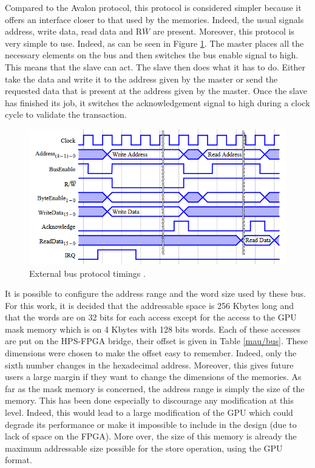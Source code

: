 Compared to the Avalon protocol, this protocol is considered simpler because it offers an interface 
closer to that used by the memories.
Indeed, the usual signals address, write data, read data and R$\overline{W}$ are 
present. Moreover, this protocol is very simple to use. Indeed, as can be seen in Figure \ref{fig:mau/bus_bridge_protocol}. The master 
places all the necessary elements on the bus and then switches the bus enable signal to high. This means 
that the slave can act. The slave then does what it has to do. Either take the data and write it to 
the address given by the master or send the requested data that is present at the address given by 
the master. Once the slave has finished its job, it switches the acknowledgement signal to high 
during a clock cycle to validate the transaction. 

\begin{figure}[ht!]
    \center
    \includegraphics[scale=0.8]{"Chapter5-MAU_CTRLU/res/external_bus_timings.PNG"}
    \caption{External bus protocol timings \cite{bus}.}
    \label{fig:mau/bus_bridge_protocol}
\end{figure}

It is possible to configure the address range and the word size used by these bus. For this work, 
it is decided that the 
addressable space is 256 Kbytes long and that the words are on 32 bits for each access except for the 
access to the GPU mask memory which is on 4 Kbytes with 128 bits words. Each of these accesses are 
put on the HPS-FPGA bridge, their offset is given in Table \ref{mau/bus}. These dimensions were 
chosen to make the offset easy to remember. Indeed, only the sixth number changes in the 
hexadecimal address. Moreover, this gives future users a large margin if they want to change the 
dimensions of the memories. As far as the mask memory is concerned, the address range is simply the 
size of the memory. This has been done especially to discourage any modification at this level. 
Indeed, this would lead to a large modification of the GPU which could degrade its performance or 
make it impossible to include in the design (due to lack of space on the FPGA). More over, the size
of this memory is already the maximum addressable size possible for the store operation, using the
GPU format.


